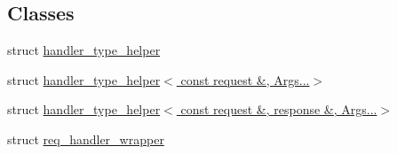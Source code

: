 \subsection*{Classes}
\begin{DoxyCompactItemize}
\item 
struct \hyperlink{structcrow_1_1detail_1_1routing__handler__call__helper_1_1_wrapped_1_1handler__type__helper}{handler\-\_\-type\-\_\-helper}
\item 
struct \hyperlink{structcrow_1_1detail_1_1routing__handler__call__helper_1_1_wrapped_1_1handler__type__helper_3_01176bac6491f2834cd36a05c30aa75bc3}{handler\-\_\-type\-\_\-helper$<$ const request \&, Args...$>$}
\item 
struct \hyperlink{structcrow_1_1detail_1_1routing__handler__call__helper_1_1_wrapped_1_1handler__type__helper_3_01506e35faa94646c63b5476ce8ce1df0a}{handler\-\_\-type\-\_\-helper$<$ const request \&, response \&, Args...$>$}
\item 
struct \hyperlink{structcrow_1_1detail_1_1routing__handler__call__helper_1_1_wrapped_1_1req__handler__wrapper}{req\-\_\-handler\-\_\-wrapper}
\end{DoxyCompactItemize}
